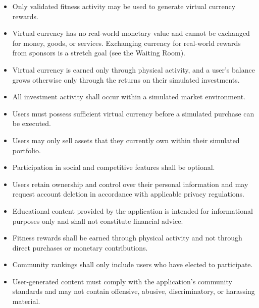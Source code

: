 \documentclass[12pt]{article}
\begin{document}
\begin{itemize} 
  \item Only validated fitness activity may be used to generate virtual currency rewards. 
  \item Virtual currency has no real-world monetary value and cannot be exchanged for money, goods, or services. Exchanging currency for real-world rewards from sponsors is a stretch goal (see the Waiting Room).
  \item Virtual currency is earned only through physical activity, and a user's balance grows otherwise only through the returns on their simulated investments.
  \item All investment activity shall occur within a simulated market environment. 
  \item Users must possess sufficient virtual currency before a simulated purchase can be executed. 
  \item Users may only sell assets that they currently own within their simulated portfolio. 
  \item Participation in social and competitive features shall be optional. 
  \item Users retain ownership and control over their personal information and may request account deletion in accordance with applicable privacy regulations. 
  \item Educational content provided by the application is intended for informational purposes only and shall not constitute financial advice. 
  \item Fitness rewards shall be earned through physical activity and not through direct purchases or monetary contributions. 
  \item Community rankings shall only include users who have elected to participate. 
  \item User-generated content must comply with the application's community standards and may not contain offensive, abusive, discriminatory, or harassing material. 
\end{itemize}
\end{document}
